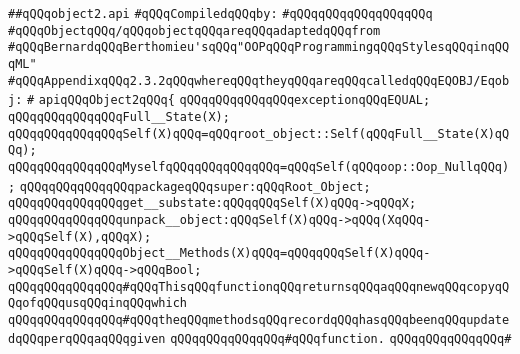 \label{src/lib/src/object2.api}
\verb|##qQQqobject2.api|\newline
\newline
\verb|#qQQqCompiledqQQqby:|\newline
\verb|#qQQqqQQqqQQqqQQqqQQq|\newline
\newline
\verb|#qQQqObjectqQQq/qQQqobjectqQQqareqQQqadaptedqQQqfrom|\newline
\verb|#qQQqBernardqQQqBerthomieu'sqQQq"OOPqQQqProgrammingqQQqStylesqQQqinqQQqML"|\newline
\verb|#qQQqAppendixqQQq2.3.2qQQqwhereqQQqtheyqQQqareqQQqcalledqQQqEQOBJ/Eqobj:|\newline
\verb|#|\newline
\verb|apiqQQqObject2qQQq{|\newline
\newline
\verb|qQQqqQQqqQQqqQQqexceptionqQQqEQUAL;|\newline
\newline
\verb|qQQqqQQqqQQqqQQqFull__State(X);|\newline
\verb|qQQqqQQqqQQqqQQqSelf(X)qQQq=qQQqroot_object::Self(qQQqFull__State(X)qQQq);|\newline
\verb|qQQqqQQqqQQqqQQqMyselfqQQqqQQqqQQqqQQq=qQQqSelf(qQQqoop::Oop_NullqQQq);|\newline
\newline
\verb|qQQqqQQqqQQqqQQqpackageqQQqsuper:qQQqRoot_Object;|\newline
\newline
\verb|qQQqqQQqqQQqqQQqget__substate:qQQqqQQqSelf(X)qQQq->qQQqX;|\newline
\verb|qQQqqQQqqQQqqQQqunpack__object:qQQqSelf(X)qQQq->qQQq(XqQQq->qQQqSelf(X),qQQqX);|\newline
\newline
\verb|qQQqqQQqqQQqqQQqObject__Methods(X)qQQq=qQQqqQQqSelf(X)qQQq->qQQqSelf(X)qQQq->qQQqBool;|\newline
\newline
\verb|qQQqqQQqqQQqqQQq#qQQqThisqQQqfunctionqQQqreturnsqQQqaqQQqnewqQQqcopyqQQqofqQQqusqQQqinqQQqwhich|\newline
\verb|qQQqqQQqqQQqqQQq#qQQqtheqQQqmethodsqQQqrecordqQQqhasqQQqbeenqQQqupdatedqQQqperqQQqaqQQqgiven|\newline
\verb|qQQqqQQqqQQqqQQq#qQQqfunction.|\newline
\verb|qQQqqQQqqQQqqQQq#|\newline
